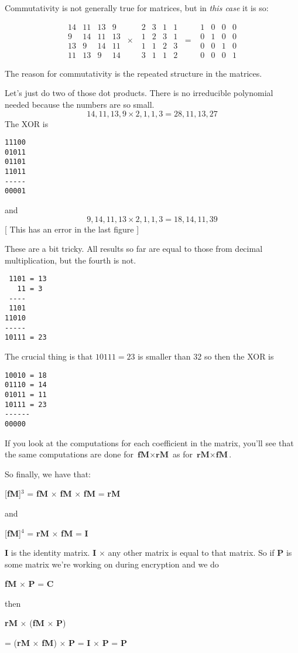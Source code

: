 \documentclass[11pt, oneside]{article}
\begin{document}
Commutativity is not generally true for matrices, but in \emph{this case} it is so:

\[  
\begin{matrix}
14 & 11 & 13 & 9 \\
9 & 14 & 11 & 13 \\
13 & 9 & 14 & 11 \\
11 & 13 & 9 & 14
\end{matrix}
\ \times \ \
\begin{matrix}
2 & 3 & 1 & 1 \\
1 & 2 & 3 & 1 \\
1 & 1 & 2 & 3 \\
3 & 1 & 1 & 2
\end{matrix}
\ = \ \ 
\begin{matrix}
1 & 0 & 0 & 0 \\
0 & 1 & 0 & 0 \\
0 & 0 & 1 & 0 \\
0 & 0 & 0 & 1
\end{matrix}
\]

The reason for commutativity is the repeated structure in the matrices.

Let's just do two of those dot products.  There is no irreducible polynomial needed because the numbers are so small.
\[ 14,11,13,9 \times 2,1,1,3 = 28, 11, 13, 27 \]
The XOR is
\begin{verbatim}
11100
01011
01101
11011
-----
00001
\end{verbatim}
and
\[ 9,14,11,13 \times 2,1,1,3 = 18,14, 11,39 \]
[ This has an error in the last figure ]

These are a bit tricky.  All results so far are equal to those from decimal multiplication, but the fourth is not.
\begin{verbatim}
 1101 = 13
   11 = 3
 ----
 1101
11010
-----
10111 = 23
\end{verbatim}
The crucial thing is that $10111 = 23$ is smaller than 32 so then the XOR is
\begin{verbatim}
10010 = 18
01110 = 14
01011 = 11
10111 = 23
------
00000
\end{verbatim}

If you look at the computations for each coefficient in the matrix, you'll see that the same computations are done for $\textbf{fM} \times \textbf{rM}$ as for $\textbf{rM} \times \textbf{fM}$.

So finally, we have that:

[\textbf{fM}]$^3$ = \textbf{fM} $\times$ \textbf{fM} $\times$ \textbf{fM} = \textbf{rM}

and

[\textbf{fM}]$^4$ = \textbf{rM} $\times$ \textbf{fM} = \textbf{I}

\textbf{I} is the identity matrix. \textbf{I} $\times$ any other matrix is equal to that matrix.  So if \textbf{P} is some matrix we're working on during encryption and we do 

\textbf{fM} $\times$ \textbf{P} = \textbf{C}

then

\textbf{rM} $\times$ (\textbf{fM} $\times$ \textbf{P})

= (\textbf{rM} $\times$ \textbf{fM}) $\times$ \textbf{P} = \textbf{I} $\times$ \textbf{P} = \textbf{P}
\end{document}
